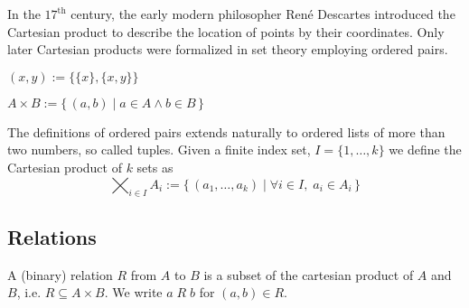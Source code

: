 In the $17^{\text{th}}$ century, the early modern philosopher René Descartes introduced the Cartesian product to describe the location of points by their coordinates. 
Only later Cartesian products were formalized in set theory employing ordered pairs. 

\begin{definition}\label{def:ordered-pair}
\((x,y):=\bigl\{\{x\},\{x,y\}\bigr\}\)
\end{definition}

\begin{definition}\label{def:cartesian-product}
\(A \times B:=\{\, (a,b)\mid a\in A \wedge b\in B\,\}\)
\end{definition}

The definitions of ordered pairs extends naturally to ordered lists of more than two numbers, so called tuples. Given a finite index set, $I=\{1, \ldots, k\}$ we define the Cartesian product of $k$ sets as
\[
\bigtimes_{i\in I}A_i:=\bigl\{\,(a_1,\dots,a_k)\mid \forall i\in I,\;a_i\in A_i\,\bigr\}
\]

\subsection{Relations}\label{subsec:relations}


\begin{definition}\label{def:binary-relation}
A (binary) relation \(R\) from \(A\) to \(B\) is a subset of the cartesian product of \(A\) and \(B\), i.e. \(R\subseteq A\times B\).  
We write \(a\;R\;b\) for \((a,b)\in R\).
\end{definition}


\newcommand{\highlightnode}[3][red!20]{%
  \tikzmarknode{#2}{#3}%
  \begin{tikzpicture}[remember picture,overlay,baseline]
    \begin{scope}[shift={(#2)}]     %
      \node[inner sep=0pt,outer sep=0.5pt,opacity=0] (tmp) {$#3$}; %
      \fill[#1, rounded corners=0.5pt] ($(tmp.south west)$) rectangle ($(tmp.north east)$); %
      \node at (tmp) {$#3$};  %
    \end{scope}
  \end{tikzpicture}%
}


